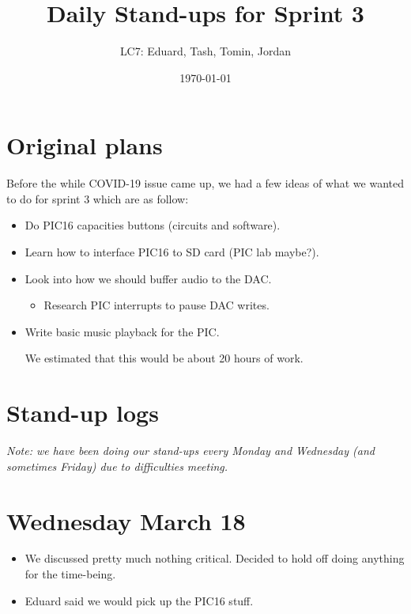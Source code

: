 \documentclass[11pt]{article}
\author{LC7: Eduard, Tash, Tomin, Jordan}
\date{\today}
\title{Daily Stand-ups for Sprint 3}
\begin{document}
\maketitle

\section*{Original plans}
\label{sec:orgad1d36e}
Before the while COVID-19 issue came up, we had a few ideas of what we
wanted to do for sprint 3 which are as follow:

\begin{itemize}
\item Do PIC16 capacities buttons (circuits and software).
\item Learn how to interface PIC16 to SD card (PIC lab maybe?).
\item Look into how we should buffer audio to the DAC.
\begin{itemize}
\item Research PIC interrupts to pause DAC writes.
\end{itemize}
\item Write basic music playback for the PIC.

We estimated that this would be about 20 hours of work.
\end{itemize}
\section*{Stand-up logs}
\label{sec:org9a7cf77}
\emph{Note: we have been doing our stand-ups every Monday and Wednesday (and sometimes Friday) due to difficulties meeting.}
\section*{Wednesday March 18}
\label{sec:org20969f6}
\begin{itemize}
\item We discussed pretty much nothing critical. Decided to hold off doing anything for the time-being.
\item Eduard said we would pick up the PIC16 stuff.
\end{itemize}
\end{document}
